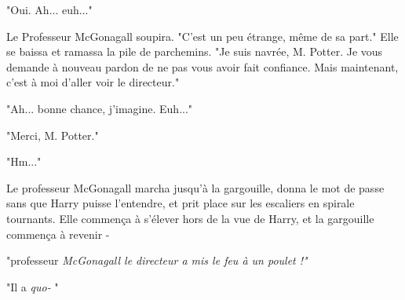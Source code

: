 "Oui. Ah... euh..."

Le Professeur McGonagall soupira. "C'est un peu étrange, même de sa part." Elle se baissa et ramassa la pile de parchemins. "Je suis navrée, M. Potter. Je vous demande à nouveau pardon de ne pas vous avoir fait confiance. Mais maintenant, c'est à moi d'aller voir le directeur."

"Ah... bonne chance, j'imagine. Euh..."

"Merci, M. Potter."

"Hm..."

Le professeur McGonagall marcha jusqu'à la gargouille, donna le mot de passe sans que Harry puisse l'entendre, et prit place sur les escaliers en spirale tournants. Elle commença à s'élever hors de la vue de Harry, et la gargouille commença à revenir -

"professeur\emph{ McGonagall le directeur a mis le feu à un poulet !"} 

"Il a \emph{quo-} "

